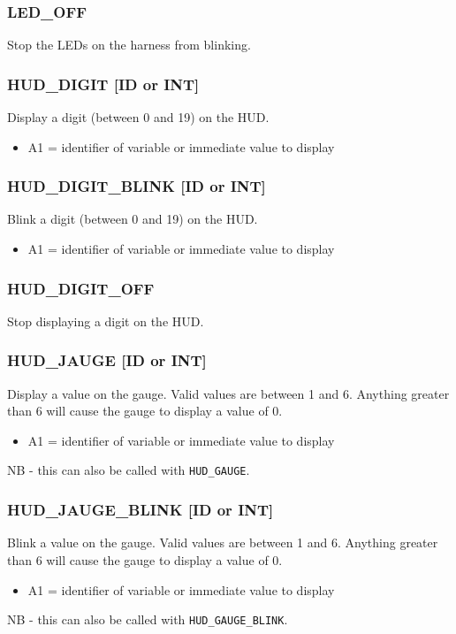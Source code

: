 \documentclass[12pt,a4paper]{scrbook}
\begin{document}
\subsubsection{LED\_OFF}
Stop the LEDs on the harness from blinking.



\subsubsection{HUD\_DIGIT [ID or INT]}
Display a digit (between 0 and 19) on the HUD. 
\begin{itemize}
\item A1 = identifier of variable or immediate value to display
\end{itemize}

\subsubsection{HUD\_DIGIT\_BLINK [ID or INT]}
Blink a digit (between 0 and 19) on the HUD. 
\begin{itemize}
\item A1 = identifier of variable or immediate value to display
\end{itemize}

\subsubsection{HUD\_DIGIT\_OFF}
Stop displaying a digit on the HUD.



\subsubsection{HUD\_JAUGE [ID or INT]}
Display a value on the gauge.  Valid values are between 1 and 6.  Anything greater
than 6 will cause the gauge to display a value of 0.  
\begin{itemize}
\item A1 = identifier of variable or immediate value to display
\end{itemize}
NB - this can also be called with \texttt{HUD\_GAUGE}.

\subsubsection{HUD\_JAUGE\_BLINK [ID or INT]}
Blink a value on the gauge.  Valid values are between 1 and 6.  Anything greater
than 6 will cause the gauge to display a value of 0.  
\begin{itemize}
\item A1 = identifier of variable or immediate value to display
\end{itemize}
NB - this can also be called with \texttt{HUD\_GAUGE\_BLINK}.
\end{document}
